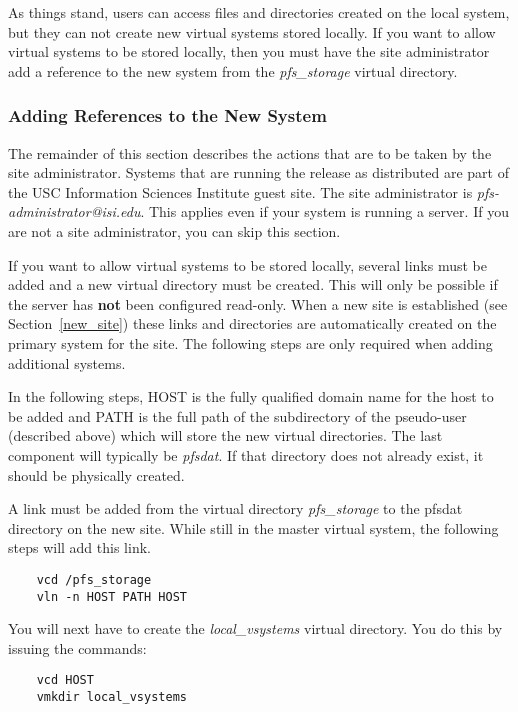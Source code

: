 As things stand, users can access files and directories created on the
local system, but they can not create new virtual systems stored
locally.  If you want to allow virtual systems to be stored locally,
then you must have the site administrator add a reference to the new
system from the {\it pfs\_storage} virtual directory.

\subsubsection*{Adding References to the New System}

The remainder of this section describes the actions that are to be
taken by the site administrator.  Systems that are running the release
as distributed are part of the USC Information Sciences Institute
guest site.  The site administrator is {\it
pfs-administrator@isi.edu}.  This applies even if your system is
running a server.  If you are not a site administrator, you can skip
this section.

If you want to allow virtual systems to be stored locally, several
links must be added and a new virtual directory must be created.  This
will only be possible if the server has {\bf not} been configured read-only.
When a new site is established (see Section~\ref{new_site}) these
links and directories are automatically created on the primary system
for the site.  The following steps are only required when adding
additional systems.

In the following steps, HOST is the fully qualified domain name for
the host to be added and PATH is the full path of the subdirectory of
the pseudo-user (described above) which will store the new virtual
directories.  The last component will typically be {\it pfsdat}.  If
that directory does not already exist, it should be physically created.

A link must be added from the virtual directory {\it pfs\_storage} to
the pfsdat directory on the new site.  While still in the master
virtual system, the following steps will add this link.

\begin{verbatim}
    vcd /pfs_storage
    vln -n HOST PATH HOST
\end{verbatim}

You will next have to create the {\it local\_vsystems} virtual
directory.  You do this by issuing the commands:

\begin{verbatim}
    vcd HOST
    vmkdir local_vsystems
\end{verbatim}

